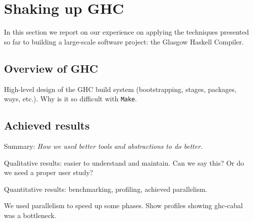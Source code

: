 \section{Shaking up GHC\label{sec:ghc}}

In this section we report on our experience on applying the techniques presented
so far to building a large-scale software project: the Glasgow Haskell Compiler.

\subsection{Overview of GHC}

High-level design of the GHC build system (bootstrapping, stages,
packages, ways, etc.). Why is it so difficult with \texttt{Make}.

\subsection{Achieved results}

Summary: \emph{How we used better tools and abstractions to do better.}

Qualitative results: easier to understand and maintain. Can we say this? Or do
we need a proper user study?

Quantitative results: benchmarking, profiling, achieved parallelism.

We used parallelism to speed up some phases. Show profiles showing ghc-cabal was a bottleneck.
